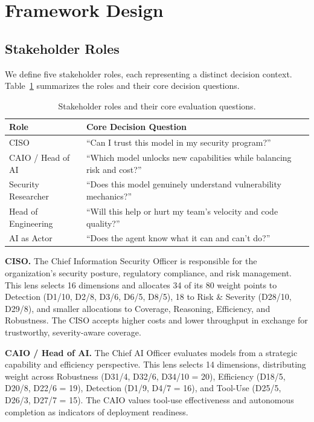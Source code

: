 \documentclass[10pt,twocolumn]{article}
\begin{document}
\section{Framework Design}
\label{sec:framework}

\subsection{Stakeholder Roles}
\label{sec:roles}

We define five stakeholder roles, each representing a distinct decision context. Table~\ref{tab:roles} summarizes the roles and their core decision questions.

\begin{table}[t]
\centering
\caption{Stakeholder roles and their core evaluation questions.}
\label{tab:roles}
\small
\begin{tabular}{@{}p{2.0cm}p{5.0cm}@{}}
\toprule
\textbf{Role} & \textbf{Core Decision Question} \\
\midrule
CISO & ``Can I trust this model in my security program?'' \\
\addlinespace[3pt]
CAIO / Head of AI & ``Which model unlocks new capabilities while balancing risk and cost?'' \\
\addlinespace[3pt]
Security Researcher & ``Does this model genuinely understand vulnerability mechanics?'' \\
\addlinespace[3pt]
Head of Engineering & ``Will this help or hurt my team's velocity and code quality?'' \\
\addlinespace[3pt]
AI as Actor & ``Does the agent know what it can and can't do?'' \\
\bottomrule
\end{tabular}
\end{table}

\textbf{CISO.} The Chief Information Security Officer is responsible for the organization's security posture, regulatory compliance, and risk management. This lens selects 16 dimensions and allocates 34 of its 80 weight points to Detection (D1/10, D2/8, D3/6, D6/5, D8/5), 18 to Risk \& Severity (D28/10, D29/8), and smaller allocations to Coverage, Reasoning, Efficiency, and Robustness. The CISO accepts higher costs and lower throughput in exchange for trustworthy, severity-aware coverage.

\textbf{CAIO / Head of AI.} The Chief AI Officer evaluates models from a strategic capability and efficiency perspective. This lens selects 14 dimensions, distributing weight across Robustness (D31/4, D32/6, D34/10 = 20), Efficiency (D18/5, D20/8, D22/6 = 19), Detection (D1/9, D4/7 = 16), and Tool-Use (D25/5, D26/3, D27/7 = 15). The CAIO values tool-use effectiveness and autonomous completion as indicators of deployment readiness.
\end{document}
